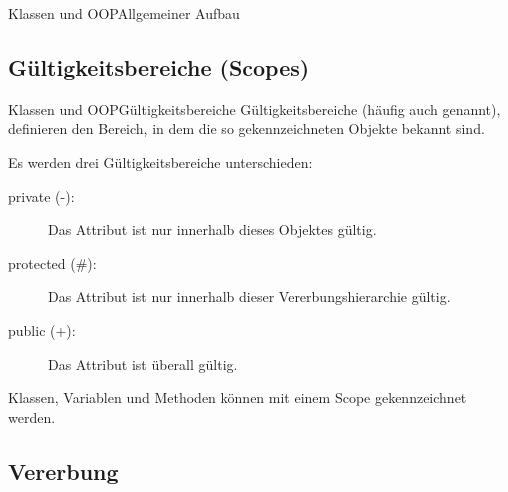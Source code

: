 %
%
\begin{frame}{Klassen und OOP}{Allgemeiner Aufbau}
\end{frame}

\subsection{Gültigkeitsbereiche (Scopes)}
\begin{frame}[shrink]{Klassen und OOP}{Gültigkeitsbereiche}
Gültigkeitsbereiche (häufig auch  genannt), definieren den Bereich, in dem die so gekennzeichneten Objekte bekannt sind.

Es werden drei Gültigkeitsbereiche unterschieden:
    \begin{description}
        \item[private (-):] Das Attribut ist nur innerhalb dieses Objektes gültig. 
        \item[protected (\#):] Das Attribut ist nur innerhalb dieser Vererbungshierarchie gültig.
        \item[public (+):] Das Attribut ist überall gültig. 
    \end{description}
Klassen, Variablen und Methoden können mit einem Scope gekennzeichnet werden.
\end{frame}

\subsection{Vererbung}
